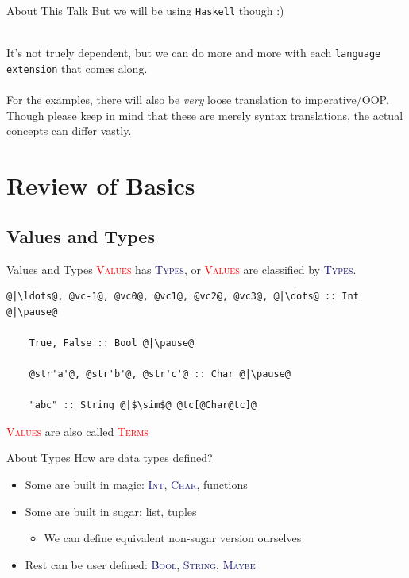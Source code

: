 \documentclass[xcolor={usenames,dvipsnames}]{beamer}
\newcommand{\htycon}[1]{\textcolor{MidnightBlue}{\textsc{#1}}}
\newcommand{\hvalcon}[1]{\textcolor{Red}{\textsc{#1}}}
\begin{document}
\begin{frame}{About This Talk}
  But we will be using \texttt{Haskell} though :)

  \ \\
  \pause
  It's not truely dependent, but we can do more and more with each \texttt{language extension} that comes along.\\

  \ \\
  \pause
  For the examples, there will also be \textit{very} loose translation to imperative/OOP. Though please keep in mind that these are merely syntax translations, the actual concepts can differ vastly.
\end{frame}


\section{Review of Basics}

\subsection{Values and Types}

\begin{frame}[fragile]{Values and Types}
  \hvalcon{Values} has \htycon{Types}, or \hvalcon{Values} are classified by \htycon{Types}.\\

  \begin{lstlisting}[style=hask]
    @|\ldots@, @vc-1@, @vc0@, @vc1@, @vc2@, @vc3@, @|\dots@ :: Int @|\pause@

    True, False :: Bool @|\pause@

    @str'a'@, @str'b'@, @str'c'@ :: Char @|\pause@

    "abc" :: String @|$\sim$@ @tc[@Char@tc]@

  \end{lstlisting}

  \tiny{\hvalcon{Values} are also called \hvalcon{Terms}}
\end{frame}

\begin{frame}[fragile]{About Types}
  How are data types defined?\\
  \pause
  \begin{itemize}
    \item Some are built in magic: \htycon{Int}, \htycon{Char}, functions
    \pause
    \item Some are built in sugar: list, tuples
      \begin{itemize}
        \item We can define equivalent non-sugar version ourselves
      \end{itemize}
    \pause
    \item Rest can be user defined: \htycon{Bool}, \htycon{String}, \htycon{Maybe}
  \end{itemize}
\end{frame}
\end{document}
